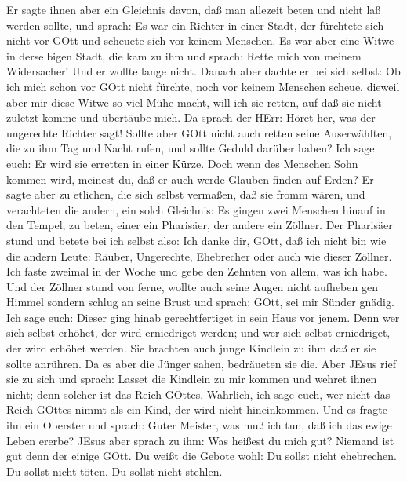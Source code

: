  Er sagte ihnen aber ein Gleichnis davon, daß man allezeit
beten und nicht laß werden sollte,  und sprach: Es war ein
Richter in einer Stadt, der fürchtete sich nicht vor GOtt und scheuete
sich vor keinem Menschen.  Es war aber eine Witwe in
derselbigen Stadt, die kam zu ihm und sprach: Rette mich von meinem
Widersacher!  Und er wollte lange nicht. Danach aber dachte
er bei sich selbst: Ob ich mich schon vor GOtt nicht fürchte, noch vor
keinem Menschen scheue,  dieweil aber mir diese Witwe so
viel Mühe macht, will ich sie retten, auf daß sie nicht zuletzt komme
und übertäube mich.  Da sprach der HErr: Höret her, was der
ungerechte Richter sagt!  Sollte aber GOtt nicht auch retten
seine Auserwählten, die zu ihm Tag und Nacht rufen, und sollte Geduld
darüber haben?  Ich sage euch: Er wird sie erretten in einer
Kürze. Doch wenn des Menschen Sohn kommen wird, meinest du, daß er auch
werde Glauben finden auf Erden?  Er sagte aber zu etlichen,
die sich selbst vermaßen, daß sie fromm wären, und verachteten die
andern, ein solch Gleichnis:  Es gingen zwei Menschen
hinauf in den Tempel, zu beten, einer ein Pharisäer, der andere ein
Zöllner.  Der Pharisäer stund und betete bei ich selbst
also: Ich danke dir, GOtt, daß ich nicht bin wie die andern Leute:
Räuber, Ungerechte, Ehebrecher oder auch wie dieser Zöllner.
 Ich faste zweimal in der Woche und gebe den Zehnten von
allem, was ich habe.  Und der Zöllner stund von ferne,
wollte auch seine Augen nicht aufheben gen Himmel sondern schlug an
seine Brust und sprach: GOtt, sei mir Sünder gnädig.  Ich
sage euch: Dieser ging hinab gerechtfertiget in sein Haus vor jenem.
Denn wer sich selbst erhöhet, der wird erniedriget werden; und wer sich
selbst erniedriget, der wird erhöhet werden.  Sie brachten
auch junge Kindlein zu ihm daß er sie sollte anrühren. Da es aber die
Jünger sahen, bedräueten sie die.  Aber JEsus rief sie zu
sich und sprach: Lasset die Kindlein zu mir kommen und wehret ihnen
nicht; denn solcher ist das Reich GOttes.  Wahrlich, ich
sage euch, wer nicht das Reich GOttes nimmt als ein Kind, der wird nicht
hineinkommen.  Und es fragte ihn ein Oberster und sprach:
Guter Meister, was muß ich tun, daß ich das ewige Leben ererbe?
 JEsus aber sprach zu ihm: Was heißest du mich gut? Niemand
ist gut denn der einige GOtt.  Du weißt die Gebote wohl: Du
sollst nicht ehebrechen. Du sollst nicht töten. Du sollst nicht stehlen.
